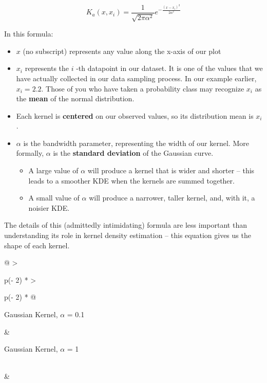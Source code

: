 \documentclass[
  letterpaper,
  DIV=11,
  numbers=noendperiod]{scrreprt}
\providecommand{\tightlist}{%
  \setlength{\itemsep}{0pt}\setlength{\parskip}{0pt}}\usepackage{longtable,booktabs,array}
\begin{document}
\[K_a(x, x_i) = \frac{1}{\sqrt{2\pi\alpha^{2}}}e^{-\frac{(x-x_i)^{2}}{2\alpha^{2}}}\]

In this formula:

\begin{itemize}
\tightlist
\item
  \(x\) (no subscript) represents any value along the x-axis of our plot
\item
  \(x_i\) represents the \(i\) -th datapoint in our dataset. It is one
  of the values that we have actually collected in our data sampling
  process. In our example earlier, \(x_i=2.2\). Those of you who have
  taken a probability class may recognize \(x_i\) as the \textbf{mean}
  of the normal distribution.
\item
  Each kernel is \textbf{centered} on our observed values, so its
  distribution mean is \(x_i\).
\item
  \(\alpha\) is the bandwidth parameter, representing the width of our
  kernel. More formally, \(\alpha\) is the \textbf{standard deviation}
  of the Gaussian curve.

  \begin{itemize}
  \tightlist
  \item
    A large value of \(\alpha\) will produce a kernel that is wider and
    shorter -- this leads to a smoother KDE when the kernels are summed
    together.
  \item
    A small value of \(\alpha\) will produce a narrower, taller kernel,
    and, with it, a noisier KDE.
  \end{itemize}
\end{itemize}

The details of this (admittedly intimidating) formula are less important
than understanding its role in kernel density estimation -- this
equation gives us the shape of each kernel.

\begin{longtable}[]{@{}
  >{\raggedright\arraybackslash}p{(\columnwidth - 2\tabcolsep) * }
  >{\raggedright\arraybackslash}p{(\columnwidth - 2\tabcolsep) * }@{}}
\toprule\noalign{}
\begin{minipage}[b]{\linewidth}\raggedright
Gaussian Kernel, \(\alpha\) = 0.1
\end{minipage} & \begin{minipage}[b]{\linewidth}\raggedright
Gaussian Kernel, \(\alpha\) = 1
\end{minipage} \\
\midrule\noalign{}
\endhead
\bottomrule\noalign{}
\endlastfoot
& \\
\end{longtable}
\end{document}
